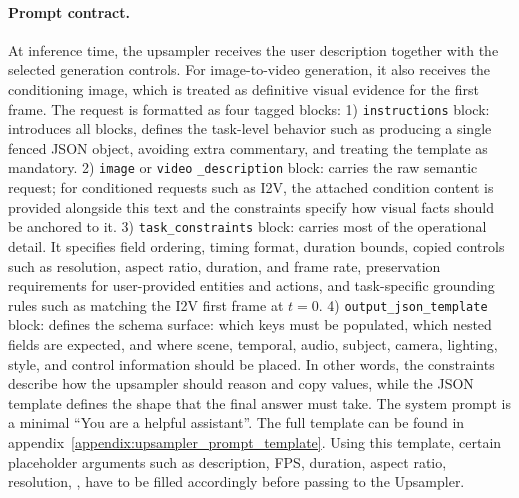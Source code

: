 \paragraph{Prompt contract.}
At inference time, the upsampler receives the user description together with the selected generation controls. For image-to-video generation, it also receives the conditioning image, which is treated as definitive visual evidence for the first frame. The request is formatted as four tagged blocks: 1) \texttt{instructions} block: introduces all blocks, defines the task-level behavior such as producing a single fenced JSON object, avoiding extra commentary, and treating the template as mandatory. 2) \texttt{image} or \texttt{video} \texttt{\_description} block: carries the raw semantic request; for conditioned requests such as I2V, the attached condition content is provided alongside this text and the constraints specify how visual facts should be anchored to it. 3) \texttt{task\_constraints} block: carries most of the
operational detail. It specifies field ordering, timing format, duration bounds, copied controls such as resolution, aspect ratio, duration, and frame rate, preservation requirements for user-provided entities and actions, and task-specific grounding rules such as matching the I2V first frame at \(t=0\). 4) \texttt{output\_json\_template} block: defines the schema surface: which keys must be populated, which nested fields are expected, and where scene, temporal, audio, subject, camera, lighting, style, and control information should be placed. In other words, the constraints describe how the upsampler should reason and copy values, while the JSON template defines the shape that the final answer
must take. The system prompt is a minimal ``You are a helpful assistant''. The full template can be found in appendix~\ref{appendix:upsampler_prompt_template}. Using this template, certain placeholder arguments such as description, FPS, duration, aspect ratio, resolution, \etc, have to be filled accordingly before passing to the Upsampler.
